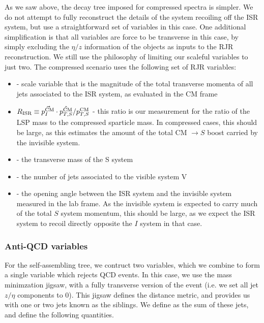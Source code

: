 As we saw above, the decay tree imposed for compressed spectra is simpler.
We do not attempt to fully reconstruct the details of the system recoiling off the ISR system, but use a straightforward set of variables in this case.
One additional simplification is that all variables are force to be transverse in this case, by simply excluding the $\eta/z$ information of the objects as inputs to the RJR reconstruction.
We still use the philosophy of limiting our scaleful variables to just two.
The compressed scenario uses the following set of RJR variables:
\begin{itemize}
\item \ptisr - scale variable that is the magnitude of the total transverse momenta of all jets associated to the ISR system, as evaluated in the CM frame
\item $R_{\text{ISR}} \equiv \vec{p_I^{\text{CM}}} \cdot \hat{p_{T,S}^{\text{CM}}} / p_{T,S}^{\text{CM}} $  - this ratio is our measurement for the ratio of the LSP mass to the compressed sparticle mass. In compressed cases, this should be large, as this estimates the amount of the total CM $\rightarrow S$ boost carried by the invisible system.
\item \MTS - the transverse mass of the S system
\item \NVjet - the number of jets associated to the visible system V
\item \dphiISR - the opening angle between the ISR system and the invisible system measured in the lab frame.  As the invisible system is expected to carry much of the total $S$ system momentum, this should be large, as we expect the ISR system to recoil directly opposite the $I$ system in that case.
\end{itemize}

\subsubsection{Anti-QCD variables}

For the self-assembling tree, we contruct two variables, which we combine to form a single variable which rejects QCD events.
In this case, we use the mass minimzation jigsaw, with a fully transverse version of the event (i.e. we set all jet $z/\eta$ components to 0).
This jigsaw defines the distance metric, and provides us with one or two jets known as the \met siblings.
We define \psib as the sum of these jets, and define the following quantities.

